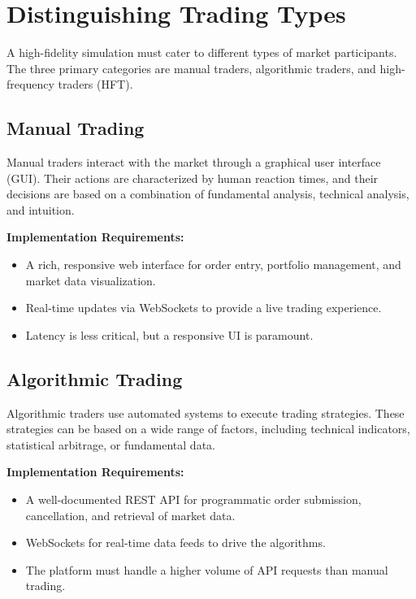 \documentclass[12pt]{article}
\begin{document}
\section{Distinguishing Trading Types}

A high-fidelity simulation must cater to different types of market participants. The three primary categories are manual traders, algorithmic traders, and high-frequency traders (HFT).

\subsection{Manual Trading}

Manual traders interact with the market through a graphical user interface (GUI). Their actions are characterized by human reaction times, and their decisions are based on a combination of fundamental analysis, technical analysis, and intuition.

\textbf{Implementation Requirements:}
\begin{itemize}
    \item A rich, responsive web interface for order entry, portfolio management, and market data visualization.
    \item Real-time updates via WebSockets to provide a live trading experience.
    \item Latency is less critical, but a responsive UI is paramount.
\end{itemize}

\subsection{Algorithmic Trading}

Algorithmic traders use automated systems to execute trading strategies. These strategies can be based on a wide range of factors, including technical indicators, statistical arbitrage, or fundamental data.

\textbf{Implementation Requirements:}
\begin{itemize}
    \item A well-documented REST API for programmatic order submission, cancellation, and retrieval of market data.
    \item WebSockets for real-time data feeds to drive the algorithms.
    \item The platform must handle a higher volume of API requests than manual trading.
\end{itemize}
\end{document}
